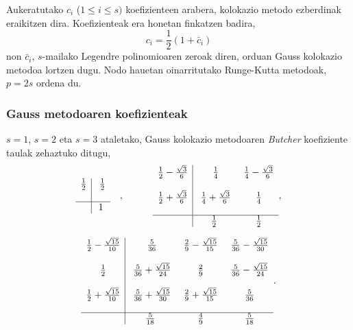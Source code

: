 Aukeratutako $c_i$ ($1 \leq i \leq s)$ koefizienteen arabera, kolokazio metodo ezberdinak eraikitzen dira. Koefizienteak era honetan finkatzen badira,
\begin{equation*}
c_i=\frac{1}{2}(1+\bar{c}_i)
\end{equation*}
non $\bar{c}_i$, $s$-mailako Legendre polinomioaren zeroak diren, orduan Gauss kolokazio metodoa lortzen dugu.
Nodo hauetan oinarritutako Runge-Kutta metodoak, $p=2s$ ordena du.

\subsubsection*{Gauss metodoaren koefizienteak}

$s=1$, $s=2$ eta $s=3$ ataletako, Gauss kolokazio metodoaren \cite{Hairer2006} \emph{Butcher} koefiziente taulak \cite{Hairer2006} zehaztuko ditugu,
\begin{equation*}
\begin{array}{c|c}
  \frac{1}{2} & \ \frac{1}{2} \\
  \\
  \hline
   & 1 \\
\end{array} \ \ \ ,  \ \ \ \ \ \ \ \ \
\begin{array}{c|c c}
  \frac{1}{2}-\frac{\sqrt{3}}{6} & \ \frac{1}{4} & \ \frac{1}{4}-\frac{\sqrt{3}}{6} \\
  \\
  \frac{1}{2}+\frac{\sqrt{3}}{6} & \ \frac{1}{4}+\frac{\sqrt{3}}{6} & \ \frac{1}{4} \\
  \\
  \hline
         &  \frac{1}{2} & \ \frac{1}{2} \\
\end{array},
\end{equation*}

\begin{equation*}
\begin{array}{c|c c c}
  \frac{1}{2}-\frac{\sqrt{15}}{10} & \ \frac{5}{36} & \ \frac{2}{9}-\frac{\sqrt{15}}{15} & \ \frac{5}{36}-\frac{\sqrt{15}}{30} \\
  \\
  \frac{1}{2}   & \ \frac{5}{36}+\frac{\sqrt{15}}{24} & \ \frac{2}{9} & \ \frac{5}{36}-\frac{\sqrt{15}}{24} \\
  \\
  \frac{1}{2}+\frac{\sqrt{15}}{10}   & \ \frac{5}{36}+\frac{\sqrt{15}}{30} & \ \frac{2}{9}+\frac{\sqrt{15}}{15} & \ \frac{5}{36} \\
  \\
  \hline
  & \frac{5}{18} & \ \frac{4}{9} & \ \frac{5}{18}
\end{array}.
\end{equation*}

